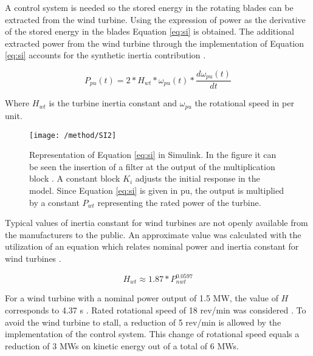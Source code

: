 A control system is needed so the stored energy in the rotating blades can be extracted from the wind turbine. Using the expression of power as the derivative of the stored energy in the blades Equation \eqref{eq:si} is obtained. The additional extracted power from the wind turbine through the implementation of Equation \eqref{eq:si} accounts for the synthetic inertia contribution \cite{NREL.2012}.

\begin{equation}
\label{eq:si}
P_{pu}(t)=2*H_{wt}*\omega_{pu}(t)*\dfrac{d\omega_{pu}(t)}{dt}
\end{equation}


Where $H_{wt}$ is the turbine inertia constant and $\omega_{pu}$ the rotational speed in per unit.

\begin{figure}[h]
\centering
\texttt{[image: /method/SI2]}
\caption{Representation of Equation \eqref{eq:si} in Simulink. In the figure it can be seen the insertion of a filter at the output of the multiplication block \cite{GeneralElectricInternational.2013, nesje2015need}. A constant block $ K_i $ adjusts the initial response in the model. Since Equation \eqref{eq:si} is given in pu, the output is multiplied by a constant $ P_{wt} $ representing the rated power of the turbine.}
\label{fig:synthetic}
\end{figure}

Typical values of inertia constant for wind turbines are not openly available from the manufacturers to the public. An approximate value was calculated with the utilization of an equation which relates nominal power and inertia constant for wind turbines \cite{GonzalezRodriguez.2007}.

\begin{equation}
\label{eq:wtinertia}
H_{wt}\approx1.87*P_{nwt}^{0.0597}
\end{equation}


For a wind turbine with a nominal power output of 1.5 MW, the value of $ H $ corresponds to 4.37 s \cite{Wu.2013}. Rated rotational speed of 18 rev/min was considered \cite{Wu.2013}. To avoid the wind turbine to stall, a reduction of 5 rev/min is allowed by the implementation of the control system. This change of rotational speed equals a reduction of 3 MWs on kinetic energy out of a total of 6 MWs.

